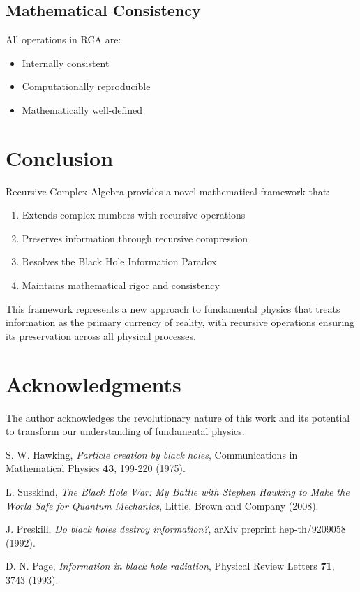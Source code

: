 \documentclass[12pt,a4paper]{article}
\begin{document}
\subsection{Mathematical Consistency}

All operations in RCA are:
\begin{itemize}
\item Internally consistent
\item Computationally reproducible
\item Mathematically well-defined
\end{itemize}

\section{Conclusion}

Recursive Complex Algebra provides a novel mathematical framework that:
\begin{enumerate}
\item Extends complex numbers with recursive operations
\item Preserves information through recursive compression
\item Resolves the Black Hole Information Paradox
\item Maintains mathematical rigor and consistency
\end{enumerate}

This framework represents a new approach to fundamental physics that treats information as the primary currency of reality, with recursive operations ensuring its preservation across all physical processes.

\section*{Acknowledgments}

The author acknowledges the revolutionary nature of this work and its potential to transform our understanding of fundamental physics.

\begin{thebibliography}{99}

S. W. Hawking,
\textit{Particle creation by black holes},
Communications in Mathematical Physics \textbf{43}, 199-220 (1975).

L. Susskind,
\textit{The Black Hole War: My Battle with Stephen Hawking to Make the World Safe for Quantum Mechanics},
Little, Brown and Company (2008).

J. Preskill,
\textit{Do black holes destroy information?},
arXiv preprint hep-th/9209058 (1992).

D. N. Page,
\textit{Information in black hole radiation},
Physical Review Letters \textbf{71}, 3743 (1993).

\end{thebibliography}
\end{document}
